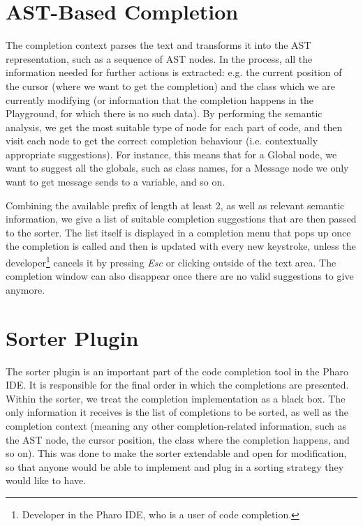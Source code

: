 \section{AST-Based Completion}
\label{sec:PharoCompletion-ASTCompletion}
The completion context parses the text and transforms it into the AST representation, such as a sequence of AST nodes. In the process, all the information needed for further actions is extracted: e.g. the current position of the cursor (where we want to get the completion) and the class which we are currently modifying (or information that the completion happens in the Playground, for which there is no such data). By performing the semantic analysis, we get the most suitable type of node for each part of code, and then visit each node to get the correct completion behaviour (i.e. contextually appropriate suggestions). For instance, this means that for a Global node, we want to suggest all the globals, such as class names, for a Message node we only want to get message sends to a variable, and so on.

Combining the available prefix of length at least 2, as well as relevant semantic information, we give a list of suitable completion suggestions that are then passed to the sorter. The list itself is displayed in a completion menu that pops up once the completion is called and then is updated with every new keystroke, unless the developer\footnote{Developer in the Pharo IDE, who is a user of code completion.} cancels it by pressing \textit{Esc} or clicking outside of the text area. The completion window can also disappear once there are no valid suggestions to give anymore.

\section{Sorter Plugin}
\label{sec:PharoCompletion-SorterPlugin}
The sorter plugin is an important part of the code completion tool in the Pharo IDE. It is responsible for the final order in which the completions are presented. Within the sorter, we treat the completion implementation as a black box. The only information it receives is the list of completions to be sorted, as well as the completion context (meaning any other completion-related information, such as the AST node, the cursor position, the class where the completion happens, and so on). This was done to make the sorter extendable and open for modification, so that anyone would be able to implement and plug in a sorting strategy they would like to have.

